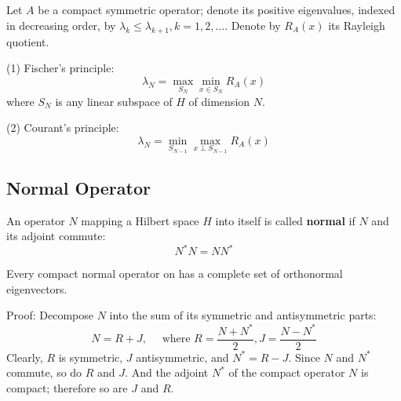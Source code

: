 \documentclass[12pt, oneside]{book}
\begin{document}
\subsection{}

\begin{theorem}
    Let $A$ be a compact symmetric operator; denote its positive eigenvalues, indexed in decreasing order, by $\lambda_k \leq \lambda_{k+1} , k=1,2, \ldots$. Denote by $R_{ {A}}(x)$ its Rayleigh quotient.

    (1) Fischer's principle:
    \begin{equation*}
        \lambda_N=\max _{S_N} \min _{x \in S_N} R_{ {A}}(x)
    \end{equation*}
    where $S_N$ is any linear subspace of $H$ of dimension $N$.

    (2) Courant's principle:
    \begin{equation*}
        \lambda_N=\min _{S_{N-1}} \max _{x \perp S_{N-1}} R_{ {A}}(x)
    \end{equation*}
\end{theorem}






\subsection{Normal Operator}

\begin{definition}
    An operator $ {N}$ mapping a Hilbert space $H$ into itself is called \textbf{normal} if $ {N}$ and its adjoint commute:
    \begin{equation*}
        {N}^*  {N}= {N N}^*
    \end{equation*}
\end{definition}

\begin{theorem}
    Every compact normal operator on has a complete set of orthonormal eigenvectors.

    Proof:
    Decompose $ {N}$ into the sum of its symmetric and antisymmetric parts:
    \begin{equation*}
        {N}= {R}+ {J}, \quad \text { where }  {R}=\frac{ {N}+ {N}^*}{2},  {J}=\frac{ {N}- {N}^*}{2}
    \end{equation*}
    Clearly, $ {R}$ is symmetric, $ {J}$ antisymmetric, and $ {N}^*= {R}- {J}$. Since $ {N}$ and $ {N}^*$ commute, so do $ {R}$ and $ {J}$. And the adjoint $ {N}^*$ of the compact operator $ {N}$ is compact; therefore so are $ {J}$ and $ {R}$.
\end{theorem}
\end{document}
